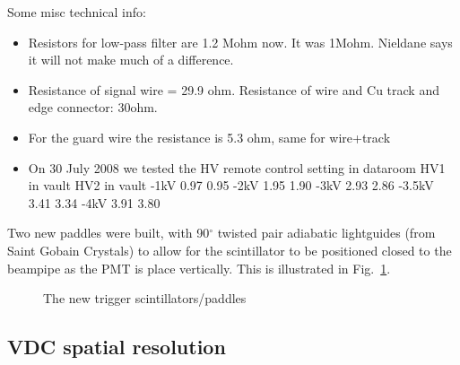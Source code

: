 \documentclass[11pt]{report}
\begin{document}
Some misc technical info:
\begin{itemize}
\item Resistors for low-pass filter are 1.2 Mohm now. 
It was 1Mohm. Nieldane says it will not make much of a difference.
\item Resistance of signal wire = 29.9 ohm.
Resistance of wire and Cu track and edge connector: 30ohm.
\item For the guard wire the resistance is 5.3 ohm, same for wire+track
\item On 30 July 2008 we tested the HV remote control
setting in dataroom  HV1 in vault   HV2 in vault
-1kV                 0.97      0.95
-2kV                 1.95      1.90
-3kV                 2.93      2.86
-3.5kV               3.41      3.34
-4kV                 3.91      3.80
\end{itemize}

Two new paddles were built, with 90$^{\circ}$ twisted pair adiabatic lightguides (from Saint Gobain Crystals)
to allow for the scintillator to be positioned closed to the beampipe
as the PMT is place vertically. This is illustrated in Fig.~\ref{fig:newpaddles}.

\begin{figure}[htbp]
\begin{center}
\end{center}
\caption{\label{fig:newpaddles}
The new trigger scintillators/paddles}
\end{figure}





\subsection{VDC spatial resolution}\label{sec:posres}

\bigskip
\end{document}
